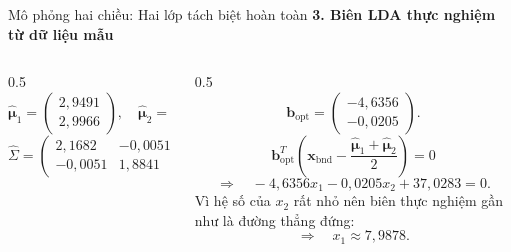 \documentclass{beamer}
\begin{document}
\begin{frame}{Mô phỏng hai chiều: Hai lớp tách biệt hoàn toàn}
	\vspace{2mm} %
\textbf{3. Biên LDA thực nghiệm từ dữ liệu mẫu}
\begin{columns}[T]
	\begin{column}{0.5\textwidth}
		\[
		\widehat{\bm{\mu}}_1=
		\begin{pmatrix}
			2{,}9491\\
			2{,}9966
		\end{pmatrix},
		\quad
		\widehat{\bm{\mu}}_2=
		\begin{pmatrix}
			12{,}9999\\
			3{,}0117
		\end{pmatrix}
		\]
		\[
		\widehat{\Sigma}=
		\begin{pmatrix}
			2{,}1682 & -0{,}0051\\
			-0{,}0051 & 1{,}8841
		\end{pmatrix}.
		\]
	\end{column}
	\begin{column}{0.5\textwidth}
		\[
		\bm{b}_{\text{opt}}
		=
		\begin{pmatrix}
			-4{,}6356\\
			-0{,}0205
		\end{pmatrix}.
		\]
		\[
		\bm{b}_{\text{opt}}^T
		\left(
		\bm{x}_{\text{bnd}}
		-
		\frac{\widehat{\bm{\mu}}_1+\widehat{\bm{\mu}}_2}{2}
		\right)
		=0
		\]
		\[
		\Rightarrow \quad -4{,}6356x_1-0{,}0205x_2+37{,}0283=0.
		\]
		Vì hệ số của \(x_2\) rất nhỏ nên biên thực nghiệm gần như là đường thẳng đứng:
		\[
		\Rightarrow \quad
		\boxed{x_1\approx 7{,}9878}.
		\]
	\end{column}
\end{columns}
\end{frame}
\end{document}
